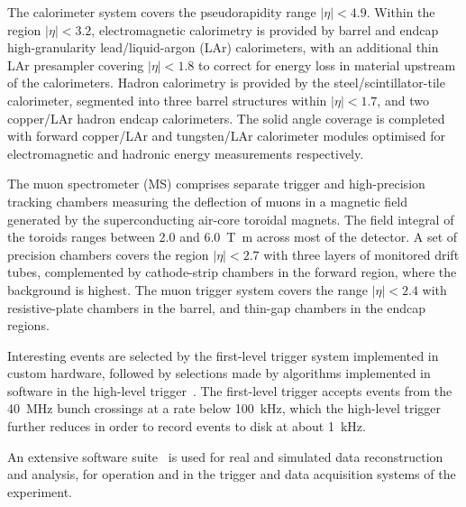The calorimeter system covers the pseudorapidity range \(|\eta| < 4.9\).
Within the region \(|\eta|< 3.2\), electromagnetic calorimetry is provided by barrel and 
endcap high-granularity lead/liquid-argon (LAr) calorimeters,
with an additional thin LAr presampler covering \(|\eta| < 1.8\)
to correct for energy loss in material upstream of the calorimeters.
Hadron calorimetry is provided by the steel/scintillator-tile calorimeter,
segmented into three barrel structures within \(|\eta| < 1.7\), and two copper/LAr hadron endcap calorimeters.
The solid angle coverage is completed with forward copper/LAr and tungsten/LAr calorimeter modules
optimised for electromagnetic and hadronic energy measurements respectively.

The muon spectrometer (MS) comprises separate trigger and
high-precision tracking chambers measuring the deflection of muons in a magnetic field generated by the superconducting air-core toroidal magnets.
The field integral of the toroids ranges between \num{2.0} and \SI{6.0}{\tesla\metre}
across most of the detector. 
A set of precision chambers covers the region \(|\eta| < 2.7\) with three layers of monitored drift tubes,
complemented by cathode-strip chambers in the forward region, where the background is highest.
The muon trigger system covers the range \(|\eta| < 2.4\) with resistive-plate chambers in the barrel, and thin-gap chambers in the endcap regions.

Interesting events are selected by the first-level trigger system implemented in custom hardware,
followed by selections made by algorithms implemented in software in the high-level trigger~\cite{TRIG-2016-01}. 
The first-level trigger accepts events from the \SI{40}{\MHz} bunch crossings at a rate below \SI{100}{\kHz},
which the high-level trigger further reduces in order to record events to disk at about \SI{1}{\kHz}.

An extensive software suite~\cite{ATL-SOFT-PUB-2021-001} is used for real and simulated data reconstruction
and analysis, for operation and in the trigger and data acquisition systems of the experiment.

